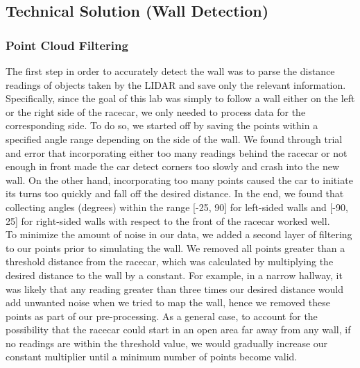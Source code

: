 \documentclass{article}
\begin{document}
\author{Miranda Cai}
\subsection{Technical Solution (Wall Detection)}
\subsubsection{Point Cloud Filtering}
The first step in order to accurately detect the wall was to parse the distance readings of objects taken by the LIDAR and save only the relevant information. Specifically, since the goal of this lab was simply to follow a wall either on the left or the right side of the racecar, we only needed to process data for the corresponding side. To do so, we started off by saving the points within a specified angle range depending on the side of the wall. We found through trial and error that incorporating either too many readings behind the racecar or not enough in front made the car detect corners too slowly and crash into the new wall. On the other hand, incorporating too many points caused the car to initiate its turns too quickly and fall off the desired distance. In the end, we found that collecting angles (degrees) within the range [-25, 90] for left-sided walls and [-90, 25] for right-sided walls with respect to the front of the racecar worked well.\\

To minimize the amount of noise in our data, we added a second layer of filtering to our points prior to simulating the wall. We removed all points greater than a threshold distance from the racecar, which was calculated by multiplying the desired distance to the wall by a constant. For example, in a narrow hallway, it was likely that any reading greater than three times our desired distance would add unwanted noise when we tried to map the wall, hence we removed these points as part of our pre-processing. As a general case, to account for the possibility that the racecar could start in an open area far away from any wall, if no readings are within the threshold value, we would gradually increase our constant multiplier until a minimum number of points become valid. 
\end{document}
